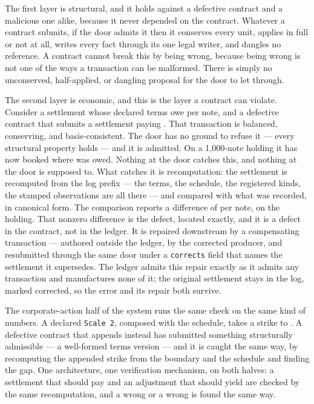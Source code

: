 The first layer is structural, and it holds against a defective contract and a
malicious one alike, because it never depended on the contract. Whatever a
contract submits, if the door admits it then it conserves every unit, applies in
full or not at all, writes every fact through its one legal writer, and dangles no
reference. A contract cannot break this by being wrong, because being wrong is not
one of the ways a transaction can be malformed. There is simply no unconserved,
half-applied, or dangling proposal for the door to let through.

The second layer is economic, and this is the layer a contract can violate.
Consider a settlement whose declared terms owe  per note, and a defective
contract that submits a settlement paying . That transaction is balanced,
conserving, and basis-consistent. The door has no ground to refuse it --- every
structural property holds --- and it is admitted. On a 1{,}000-note holding it has
now booked  where  was owed. Nothing at the door
catches this, and nothing at the door is supposed to. What catches it is
recomputation: the settlement is recomputed from the log prefix --- the terms, the
schedule, the registered kinds, the stamped observations are all there --- and
compared with what was recorded, in canonical form. The comparison reports a
difference of  per note,  on the holding. That nonzero
difference is the defect, located exactly, and it is a defect in the contract, not
in the ledger. It is repaired downstream by a compensating transaction --- authored
outside the ledger, by the corrected producer, and resubmitted through the same door
under a \texttt{corrects} field that names the  settlement it supersedes. The
ledger admits this repair exactly as it admits any transaction and manufactures none
of it; the original  settlement stays in the log, marked corrected, so the
error and its repair both survive.

The corporate-action half of the system runs the same check on the same kind of
numbers. A declared \texttt{Scale 2}, composed with the schedule, takes a
 strike to . A defective contract that appends  instead
has submitted something structurally admissible --- a well-formed terms version ---
and it is caught the same way, by recomputing the appended strike from the boundary
and the schedule and finding the  gap. One architecture, one verification
mechanism, on both halves: a settlement that should pay  and an adjustment
that should yield  are checked by the same recomputation, and a wrong
 or a wrong  is found the same way.

